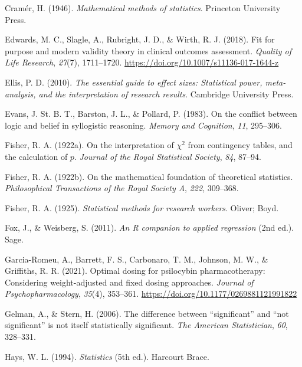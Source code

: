 \documentclass[
  11pt,
  a4paper,
  twoside,symmetric,openright]{book}
\theoremstyle{break}
\theoremstyle{break}
\begin{document}
\begin{CSLReferences}
Cramér, H. (1946). \emph{Mathematical methods of statistics}. Princeton University Press.

Edwards, M. C., Slagle, A., Rubright, J. D., \& Wirth, R. J. (2018). Fit for purpose and modern validity theory in clinical outcomes assessment. \emph{Quality of Life Research}, \emph{27}(7), 1711--1720. \url{https://doi.org/10.1007/s11136-017-1644-z}

Ellis, P. D. (2010). \emph{The essential guide to effect sizes: Statistical power, meta-analysis, and the interpretation of research results}. Cambridge University Press.

Evans, J. St. B. T., Barston, J. L., \& Pollard, P. (1983). On the conflict between logic and belief in syllogistic reasoning. \emph{Memory and Cognition}, \emph{11}, 295--306.

Fisher, R. A. (1922a). On the interpretation of \(\chi^2\) from contingency tables, and the calculation of \(p\). \emph{Journal of the Royal Statistical Society}, \emph{84}, 87--94.

Fisher, R. A. (1922b). On the mathematical foundation of theoretical statistics. \emph{Philosophical Transactions of the Royal Society A}, \emph{222}, 309--368.

Fisher, R. A. (1925). \emph{Statistical methods for research workers}. Oliver; Boyd.

Fox, J., \& Weisberg, S. (2011). \emph{An {R} companion to applied regression} (2nd ed.). Sage.

Garcia-Romeu, A., Barrett, F. S., Carbonaro, T. M., Johnson, M. W., \& Griffiths, R. R. (2021). Optimal dosing for psilocybin pharmacotherapy: {Considering} weight-adjusted and fixed dosing approaches. \emph{Journal of Psychopharmacology}, \emph{35}(4), 353--361. \url{https://doi.org/10.1177/0269881121991822}

Gelman, A., \& Stern, H. (2006). The difference between {``significant''} and {``not significant''} is not itself statistically significant. \emph{The American Statistician}, \emph{60}, 328--331.

Hays, W. L. (1994). \emph{Statistics} (5th ed.). Harcourt Brace.


\end{CSLReferences}
\end{document}
